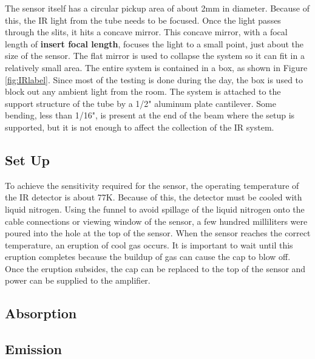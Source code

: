 The sensor itself has a circular pickup area of about 2mm in diameter. Because of this, the IR light from the tube needs to be focused. Once the light passes through the slits, it hits a concave mirror. This concave mirror, with a focal length of \textbf{insert focal length}, focuses the light to a small point, just about the size of the sensor. The flat mirror is used to collapse the system so it can fit in a relatively small area. The entire system is contained in a box, as shown in Figure \ref{fig:IRlabel}. Since most of the testing is done during the day, the box is used to block out any ambient light from the room. The system is attached to the support structure of the tube by a 1/2" aluminum plate cantilever. Some bending, less than 1/16",  is present at the end of the beam where the setup is supported, but it is not enough to affect the collection of the IR system. 


\subsection{Set Up}


To achieve the sensitivity required for the sensor, the operating temperature of the IR detector is about 77K. Because of this, the detector must be cooled with liquid nitrogen. Using the funnel to avoid spillage of the liquid nitrogen onto the cable connections or viewing window of the sensor, a few hundred milliliters were poured into the hole at the top of the sensor. When the sensor reaches the correct temperature, an eruption of cool gas occurs. It is important to wait until this eruption completes because the buildup of gas can cause the cap to blow off. Once the eruption subsides, the cap can be replaced to the top of the sensor and power can be supplied to the amplifier. 




\subsection{Absorption}



\subsection{Emission}




